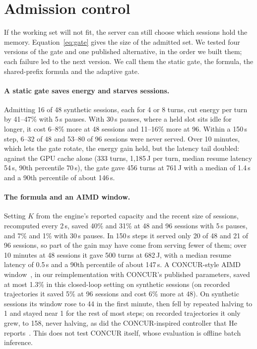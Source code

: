 \section{Admission control}
\label{sec:control}

If the working set will not fit, the server can still choose which sessions hold the memory. Equation~\eqref{eq:gate}
gives the size of the admitted set. We tested four versions of the gate and one published alternative, in the order we
built them; each failure led to the next version. We call them the static gate, the formula, the shared-prefix
formula and the adaptive gate.

\paragraph{A static gate saves energy and starves sessions.} Admitting 16 of 48 synthetic sessions, each for 4 or 8
turns, cut energy per turn by 41--47\% with 5\,s pauses. With 30\,s pauses, where a held slot sits idle for longer, it cost 6--8\% more at 48 sessions and 11--16\%
more at 96. Within a 150\,s step, 6--32 of 48 and 53--80 of 96 sessions were never served. Over 10 minutes, which lets the gate
rotate, the energy gain held, but the latency tail doubled: against the GPU cache alone (333 turns,
1,185\,J per turn, median resume latency 54\,s, 90th percentile 70\,s), the gate gave 456 turns at 761\,J with a median of 1.4\,s
and a 90th percentile of about 146\,s.

\paragraph{The formula and an AIMD window.} Setting $K$ from the engine's reported capacity and the recent size
of sessions, recomputed every 2\,s, saved 40\% and 31\% at 48 and 96 sessions with 5\,s pauses, and 7\% and 1\% with 30\,s pauses. In 150\,s steps it
served only 20 of 48 and 21 of 96 sessions, so part of the gain may have come from serving fewer of them; over 10 minutes at 48
sessions it gave 500 turns at 682\,J, with a median resume latency of 0.5\,s and a 90th percentile of about 147\,s. A CONCUR-style AIMD
window~\cite{chen2026concur}, in our reimplementation with CONCUR's published parameters, saved at most 1.3\% in this
closed-loop setting on synthetic sessions (on recorded trajectories it saved 5\% at 96 sessions and cost 6\% more at
48). On synthetic sessions its window rose to 44 in the first minute, then fell by repeated halving to 1 and stayed
near 1 for the rest of most steps; on recorded trajectories it only grew, to 158, never halving, as did the CONCUR-inspired controller that He
reports~\cite{he2026robot}. This does not test CONCUR itself, whose evaluation is offline batch inference.

